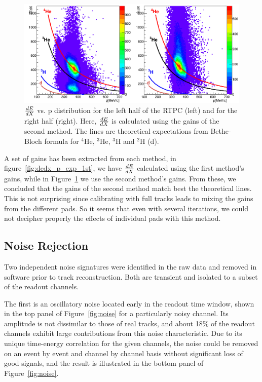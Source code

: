 \documentclass[twocolumn,showpacs,superscriptaddress,groupedaddress]{revtex4}
\begin{document}
\begin{figure}[tb]
\centering
\includegraphics[scale=0.26]{fig/dedx_p_exp_2nd.png}
\caption{$\small{\frac{dE}{dX}}$ vs. p distribution for the left half of the 
   RTPC (left) and for the right half (right). Here, $\small{\frac{dE}{dX}}$ is 
   calculated using the gains of the second method.  The lines are theoretical 
   expectations from Bethe-Bloch formula for $^4$He, $^3$He, $^3$H and $^2$H 
(d).}
\label{fig:dedx_p_exp_2nd}
\end{figure}

A set of gains has been extracted from each method, in 
figure~\ref{fig:dedx_p_exp_1st}, we have $\small{\frac{dE}{dX}}$ calculated 
using the first method's gains, while in Figure~\ref{fig:dedx_p_exp_2nd} we use 
the second method's gains. From these, we concluded that the gains of the 
second method match best the theoretical lines. This is not surprising since 
calibrating with full tracks leads to mixing the gains from the different pads.  
So it seems that even with several iterations, we could not decipher properly 
the effects of individual pads with this method.

\subsection{Noise Rejection}
Two independent noise signatures were identified in the raw data and removed in software prior to track reconstruction.  Both are transient and isolated to a subset of the readout channels. 

The first is an oscillatory noise located early in the readout time window, shown in the top panel of Figure~\ref{fig:noise} for a particularly noisy channel.  Its amplitude is not dissimilar to those of real tracks, and about 18\% of the readout channels exhibit large contributions from this noise characteristic.  Due to its unique time-energy correlation for the given channels, the noise could be removed on an event by event and channel by channel basis without significant loss of good signals, and the result is illustrated in the bottom panel of Figure~\ref{fig:noise}.
\end{document}
